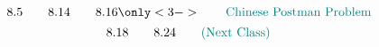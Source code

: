
\begin{frame}{}

  \pause
  \[
    8.5 \qquad 8.14 \qquad 8.16 \only<3->{\qquad \text{\teal{Chinese Postman Problem}}}
  \]
  \[
    8.18 \qquad 8.24 \qquad \text{\textcolor{teal}{(Next Class)}}
  \]
\end{frame}
